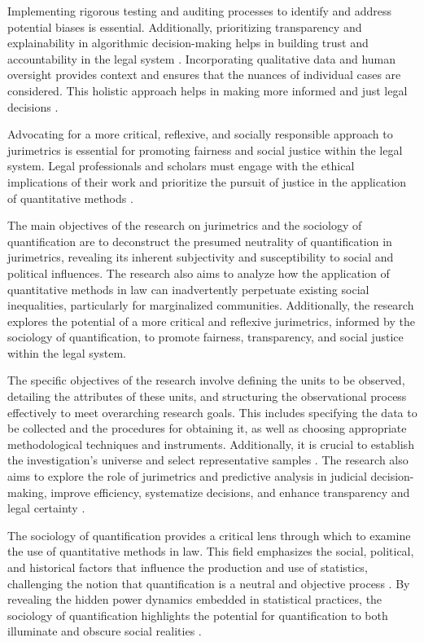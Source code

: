 Implementing rigorous testing and auditing processes to identify and address potential biases is essential. Additionally, prioritizing transparency and explainability in algorithmic decision-making helps in building trust and accountability in the legal system \cite{10.1007/s11186-021-09453-1,10.3390/fi9040068}. Incorporating qualitative data and human oversight provides context and ensures that the nuances of individual cases are considered. This holistic approach helps in making more informed and just legal decisions \cite{10.1007/s11186-021-09453-1,10.3390/fi9040068}.

Advocating for a more critical, reflexive, and socially responsible approach to jurimetrics is essential for promoting fairness and social justice within the legal system. Legal professionals and scholars must engage with the ethical implications of their work and prioritize the pursuit of justice in the application of quantitative methods \cite{10.1007/s11186-021-09453-1,10.3390/fi9040068}.

The main objectives of the research on jurimetrics and the sociology of quantification are to deconstruct the presumed neutrality of quantification in jurimetrics, revealing its inherent subjectivity and susceptibility to social and political influences. The research also aims to analyze how the application of quantitative methods in law can inadvertently perpetuate existing social inequalities, particularly for marginalized communities. Additionally, the research explores the potential of a more critical and reflexive jurimetrics, informed by the sociology of quantification, to promote fairness, transparency, and social justice within the legal system.

The specific objectives of the research involve defining the units to be observed, detailing the attributes of these units, and structuring the observational process effectively to meet overarching research goals. This includes specifying the data to be collected and the procedures for obtaining it, as well as choosing appropriate methodological techniques and instruments. Additionally, it is crucial to establish the investigation's universe and select representative samples \cite{calvo2024, calvo2024}. The research also aims to explore the role of jurimetrics and predictive analysis in judicial decision-making, improve efficiency, systematize decisions, and enhance transparency and legal certainty \cite{silva2023}.

The sociology of quantification provides a critical lens through which to examine the use of quantitative methods in law. This field emphasizes the social, political, and historical factors that influence the production and use of statistics, challenging the notion that quantification is a neutral and objective process \cite{10.1007/978-3-319-44000-215,10.3390/fi9040068}. By revealing the hidden power dynamics embedded in statistical practices, the sociology of quantification highlights the potential for quantification to both illuminate and obscure social realities \cite{10.1007/978-3-319-44000-215,10.3390/fi9040068}.


